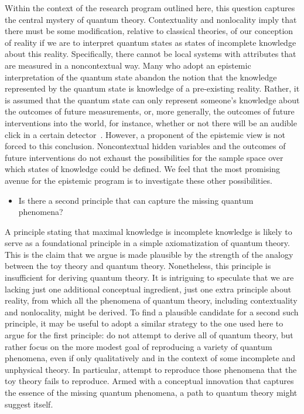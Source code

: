 \documentclass[pra,twocolumn,nofootinbib,showpacs]{revtex4}
\begin{document}
Within the context of the research program outlined here, this
question captures the central mystery of quantum theory.
Contextuality and nonlocality imply that there must be some
modification, relative to classical theories, of our conception of
reality if we are to interpret quantum states as states of
incomplete knowledge about this reality. Specifically, there
cannot be local systems with attributes that are measured in a
noncontextual way. Many who adopt an epistemic interpretation of
the quantum state abandon the notion that the knowledge
represented by the quantum state is knowledge of a pre-existing
reality. Rather, it is assumed that the quantum state can only
represent someone's knowledge about the outcomes of future
measurements, or, more generally, the outcomes of future
interventions into the world, for instance, whether or not there
will be an audible click in a certain detector~\cite{Fuchs}.
However, a proponent of the epistemic view is not forced to this
conclusion. Noncontextual hidden variables and the outcomes of
future interventions do not exhaust the possibilities for the
sample space over which states of knowledge could be defined. We
feel that the most promising avenue for the epistemic program is
to investigate these other possibilities.

\begin{itemize}
\item Is there a second principle that can capture the missing quantum
phenomena?
\end{itemize}

\strut \strut A principle stating that maximal knowledge is incomplete
knowledge is likely to serve as a foundational principle in a simple
axiomatization of quantum theory. This is the claim that we argue is made
plausible by the strength of the analogy between the toy theory and quantum
theory. Nonetheless, this principle is insufficient for deriving quantum
theory. It is intriguing to speculate that we are lacking just one
additional conceptual ingredient, just one extra principle about reality,
from which all the phenomena of quantum theory, including contextuality and
nonlocality, might be derived. To find a plausible candidate for a second
such principle, it may be useful to adopt a similar strategy to the one used
here to argue for the first principle: do not attempt to derive all of
quantum theory, but rather focus on the more modest goal of reproducing a
variety of quantum phenomena, even if only qualitatively and in the context
of some incomplete and unphysical theory. In particular, attempt to
reproduce those phenomena that the toy theory fails to reproduce. Armed with
a conceptual innovation that captures the essence of the missing quantum
phenomena, a path to quantum theory might suggest itself.
\end{document}
